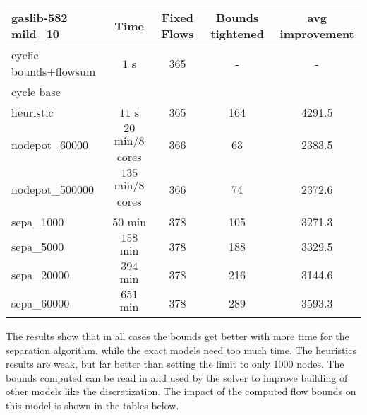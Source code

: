 \begin{center}
\begin{tabular}{ l | c | c | c | c }

\textbf{gaslib-582 mild\_10} & Time  & Fixed Flows & Bounds tightened & avg improvement\\
\hline
 cyclic bounds+flowsum& $1$ s& 365 & - & -\\
 cycle base& $ $ &  &  & \\
 heuristic& $11$ s& 365 & 164 & 4291.5\\
 nodepot\_60000& $20$ min/8 cores & 366 & 63 & 2383.5 \\ 
 nodepot\_500000& $135$ min/8 cores & 366 & 74 & 2372.6 \\ 
 sepa\_1000& $50$ min & 378 & 105 & 3271.3 \\
 sepa\_5000& $ 158$ min  & 378 & 188 & 3329.5 \\
 sepa\_20000& $ 394$ min & 378 & 216 &3144.6 \\
 sepa\_60000& $651$ min  & 378& 289 & 3593.3 \\
\end{tabular} 
\end{center}

The results show that in all cases the bounds get better with more time for the separation algorithm, while the exact 
models need too much time. The heuristics results are weak, but far better than setting the limit to only 1000 nodes. 
The bounds computed can be read in and used by the solver to improve building of other models like the discretization. 
The impact of the computed flow bounds on this model is shown in the tables below.

